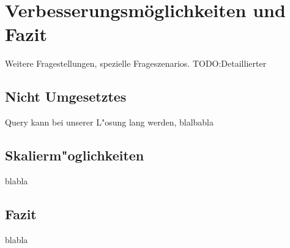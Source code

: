 \chapter{Verbesserungsmöglichkeiten und Fazit}

Weitere Fragestellungen, spezielle Frageszenarios. TODO:Detaillierter


\section{Nicht Umgesetztes}

Query kann bei unserer L"osung lang werden, blalbabla


\section{Skalierm"oglichkeiten}

blabla


\section{Fazit}
blabla

